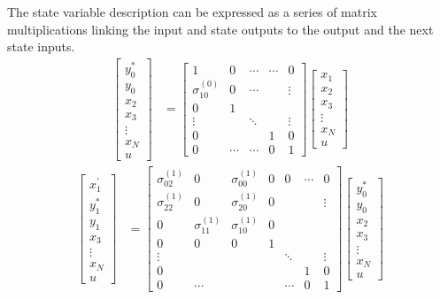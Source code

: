 \documentclass[a4paper,twoside,10pt,english]{report}
\begin{document}
The state variable description can be expressed as a series of matrix
multiplications linking the input and state outputs to the output
and the next state inputs.
\begin{align*}
\left[\begin{array}{c}
y_{0}^{*}\\
y_{0}\\
x_{2}\\
x_{3}\\
\vdots\\
x_{N}\\
u
\end{array}\right] & = \left[\begin{array}{cccccc}
1 & 0 & \cdots & \cdots & 0\\
\sigma_{10}^{\left(0\right)} & 0 & \cdots & & \vdots\\
0 & 1 & & & \\
\vdots & & \ddots & & \vdots\\
0 & & & 1 & 0 \\
0 & \cdots & \cdots & 0 & 1
\end{array}\right]\left[\begin{array}{c}
x_{1}\\
x_{2}\\
x_{3}\\
\vdots\\
x_{N}\\
u
\end{array}\right]
\end{align*}
\begin{align*}
\left[\begin{array}{c}
x_{1}^{\prime}\\
y_{1}^{*}\\
y_{1}\\
x_{3}\\
\vdots\\
x_{N}\\
u
\end{array}\right] & = \left[\begin{array}{ccccccc}
\sigma_{02}^{\left(1\right)} & 0 & \sigma_{00}^{\left(1\right)} & 0 & 0 & \cdots & 0\\
\sigma_{22}^{\left(1\right)} & 0 & \sigma_{20}^{\left(1\right)} & 0 &  &  & \vdots\\
0 & \sigma_{11}^{\left(1\right)} & \sigma_{10}^{\left(1\right)} & 0\\
0 & 0 & 0 & 1\\
\vdots &  &  &  & \ddots &  & \vdots\\
0 &  &  &  &  & 1 & 0\\
0 & \cdots &  &  & \cdots & 0 & 1
\end{array}\right]\left[\begin{array}{c}
y_{0}^{*}\\
y_{0}\\
x_{2}\\
x_{3}\\
\vdots\\
x_{N}\\
u
\end{array}\right]
\end{align*}
\end{document}
